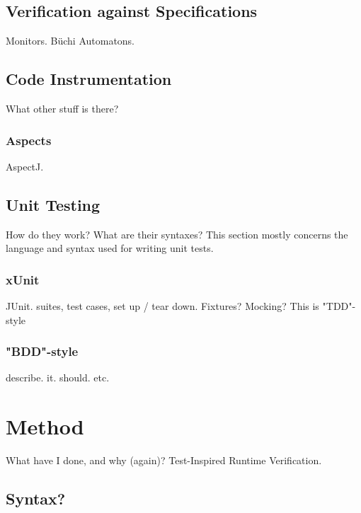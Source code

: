 \documentclass[a4paper,11pt]{kth-mag}
\begin{document}
\section{Verification against Specifications}

Monitors. Büchi Automatons.

\section{Code Instrumentation}

What other stuff is there?

\subsection{Aspects}
AspectJ.

\section{Unit Testing}

How do they work? What are their syntaxes? This section mostly concerns the language and syntax used for writing unit tests.

\subsection{xUnit}

JUnit. suites, test cases, set up / tear down. Fixtures? Mocking? This is "TDD"-style

\subsection{"BDD"-style}

describe. it. should. etc.







\pagestyle{newchap}
\chapter{Method}

What have I done, and why (again)? Test-Inspired Runtime Verification.


\section{Syntax?}
\end{document}
